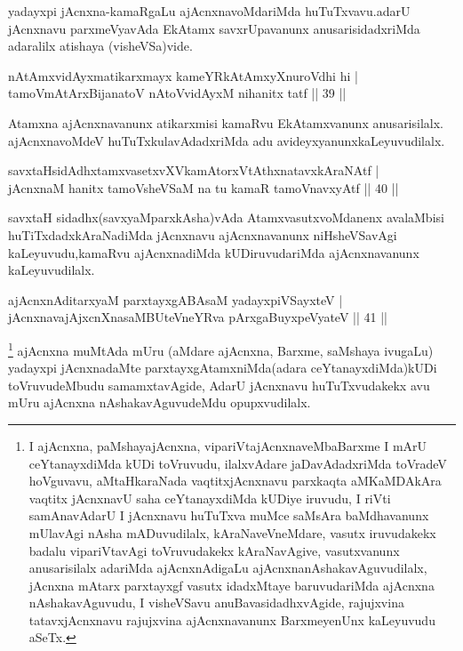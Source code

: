 \begin{artha}
yadayxpi jAcnxna-kamaRgaLu ajAcnxnavoMdariMda huTuTxvavu.\break adarU jAcnxnavu parxmeVyavAda EkAtamx savxrUpavanunx anusarisidadx\-riMda adaralilx atishaya (visheVSa)vide.
\end{artha}

\begin{shl}
nA\s \s tAmxvidAyxmatikarxmayx kameYRkAtAmxyXnuroVdhi hi |\\
tamoVmAtArxBijanatoV nAtoV\s vidAyxM nihanitx tatf \hfill || 39 ||
\end{shl}

\begin{artha}
Atamxna ajAcnxnavanunx atikarxmisi kamaRvu EkAtamxvanunx anusarisilalx. ajAcnxnavoMdeV huTuTxkulavAdadxriMda adu avideyxyanunx\break kaLeyuvudilalx.
\end{artha}

\begin{shl}
savxtaHsidAdhxtamxvasetxvXVkamAtorxVtAthxnatavxkAraNAtf |\\
jAcnxnaM hanitx tamoV\s sheVSaM na tu kamaR tamoVnavxyAtf \hfill || 40 ||
\end{shl}

\begin{artha}
savxtaH sidadhx(savxyaMparxkAsha)vAda AtamxvasutxvoMdanenx avalaMbisi huTiTxdadxkAraNadiMda jAcnxnavu ajAcnxnavanunx niHsheVSavAgi kaLeyuvudu,kamaRvu ajAcnxnadiMda kUDiruvudariMda ajAcnxnavanunx kaLeyuvudilalx.
\end{artha}

\begin{shl}
ajAcnxnAditarxyaM parxtayxgABAsaM yadayxpiVSayxteV |\\
jAcnxnavajAjxcnXnasaMBUteVneYRva pArxgaBuyxpeVyateV \hfill || 41 ||
\end{shl}

\begin{artha}
\footnote{I ajAcnxna, paMshayajAcnxna, vipariVtajAcnxnaveMbaBarxme I mArU ceYtanayxdiMda kUDi toVruvudu, ilalxvAdare jaDavAdadxriMda toVradeV hoVguvavu, aMtaHkaraNada vaqtitxjAcnxnavu parxkaqta aMKaMDAkAra vaqtitx jAcnxnavU saha ceYtanayxdiMda kUDiye iruvudu, I riVti samAnavAdarU I jAcnxnavu huTuTxva muMce saMsAra baMdhavanunx mUlavAgi nAsha mADuvudilalx, kAraNaveVneMdare, vasutx iruvudakekx badalu vipariVtavAgi toVruvudakekx kAraNavAgive, vasutxvanunx anusarisilalx adariMda ajAcnxnAdigaLu ajAcnxnanAshakavAguvudilalx, jAcnxna  mAtarx parxtayxgf vasutx idadxMtaye baruvudariMda ajAcnxna nAshakavAguvudu, I visheVSavu anuBavasidadhxvAgide, rajujxvina tatavxjAcnxnavu rajujxvina ajAcnxnavanunx BarxmeyenUnx kaLeyuvudu aSeTx.} ajAcnxna muMtAda mUru (aMdare ajAcnxna, Barxme, saMshaya ivugaLu) yadayxpi jAcnxnadaMte parxtayxgAtamxniMda(adara ceYtanayxdiMda)\break kUDi toVruvudeMbudu samamxtavAgide, AdarU jAcnxnavu huTuTxvudakekx avu mUru ajAcnxna nAshakavAguvudeMdu opupxvudilalx.
\end{artha}

